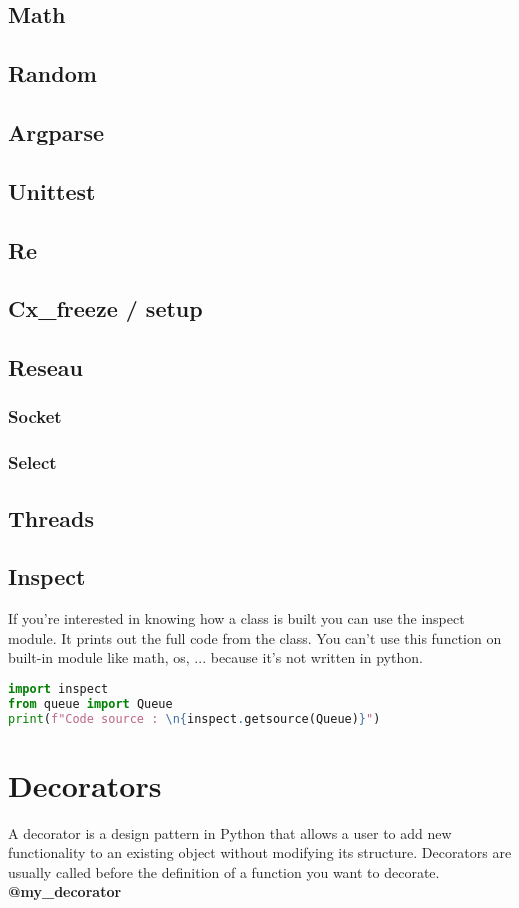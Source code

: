 \documentclass[a4paper, 12pt]{article}
\begin{document}
\subsection{Math}
\subsection{Random}
\subsection{Argparse}
\subsection{Unittest}
\subsection{Re}
\subsection{Cx\_freeze / setup}
\subsection{Reseau}
\subsubsection{Socket}
\subsubsection{Select}
\subsection{Threads}

\subsection{Inspect}
If you're interested in knowing how a class is built you can use the inspect module. It prints out the full code from the class. You can't use this function on built-in module like math, os, ... because it's not written in python.
\begin{lstlisting}[language=Python]
import inspect
from queue import Queue
print(f"Code source : \n{inspect.getsource(Queue)}")
\end{lstlisting}

\newpage
\section{Decorators}
A decorator is a design pattern in Python that allows a user to add new functionality to an existing object without modifying its structure. Decorators are usually called before the definition of a function you want to decorate. \textbf{@my\_decorator}\newline
\end{document}
